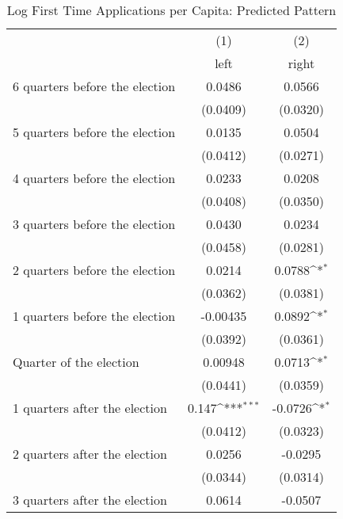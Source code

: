 \begin{table}[htbp]\centering
\def\sym#1{\ifmmode^{#1}\else\(^{#1}\)\fi}
\caption{Log First Time Applications per Capita: Predicted Pattern}
\begin{tabular}{l*{2}{c}}
\hline\hline
                    &\multicolumn{1}{c}{(1)}&\multicolumn{1}{c}{(2)}\\
                    &\multicolumn{1}{c}{left}&\multicolumn{1}{c}{right}\\
\hline
 6 quarters before the election&      0.0486         &      0.0566         \\
                    &    (0.0409)         &    (0.0320)         \\
[1em]
 5 quarters before the election&      0.0135         &      0.0504         \\
                    &    (0.0412)         &    (0.0271)         \\
[1em]
 4 quarters before the election&      0.0233         &      0.0208         \\
                    &    (0.0408)         &    (0.0350)         \\
[1em]
 3 quarters before the election&      0.0430         &      0.0234         \\
                    &    (0.0458)         &    (0.0281)         \\
[1em]
 2 quarters before the election&      0.0214         &      0.0788\sym{*}  \\
                    &    (0.0362)         &    (0.0381)         \\
[1em]
 1 quarters before the election&    -0.00435         &      0.0892\sym{*}  \\
                    &    (0.0392)         &    (0.0361)         \\
[1em]
Quarter of the election&     0.00948         &      0.0713\sym{*}  \\
                    &    (0.0441)         &    (0.0359)         \\
[1em]
 1 quarters after the election&       0.147\sym{***}&     -0.0726\sym{*}  \\
                    &    (0.0412)         &    (0.0323)         \\
[1em]
 2 quarters after the election&      0.0256         &     -0.0295         \\
                    &    (0.0344)         &    (0.0314)         \\
[1em]
 3 quarters after the election&      0.0614         &     -0.0507         \\

\end{tabular}
\end{table}
